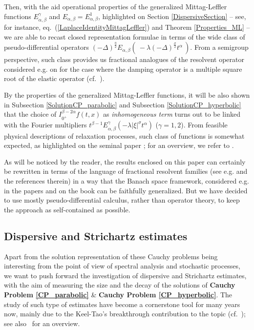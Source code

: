 \documentclass{amsart}
\theoremstyle{definition}
\theoremstyle{remark}
\numberwithin{equation}{section}
\begin{document}
Then, with the aid operational properties of the generalized Mittag-Leffler functions $E_{\alpha,\beta}^\gamma$ and $E_{\alpha,\beta}=E_{\alpha,\beta}^1$, highlighted on Section \ref{DispersiveSection} -- see, for instance, eq.~(\ref{LaplaceIdentityMittagLeffler}) and Theorem \ref{Properties_ML} -- we are able to recast closed representation formulae in terms of the wide class of pseudo-differential operators $\displaystyle (-\Delta)^{\frac{\eta}{2}}E_{\alpha,\beta}\left(~-\lambda (-\Delta)^{\frac{\sigma}{2}}t^\alpha~\right)$. From a semigroup perspective,
such class provides us fractional analogues of the resolvent operator considered e.g. on \cite{CCD08,CS05,DS15} for the case where the damping operator is a multiple square root of the elastic operator (cf.~\cite[Chapter VI]{engel2000one}).  

By the properties of the generalized Mittag-Leffler functions, it will be also shown in Subsection \ref{SolutionCP_parabolic} and Subsection \ref{SolutionCP_hyperbolic} that the choice of $I^{\beta-2\alpha}_{0^+}f(t,x)$ as {\it inhomogeneous term} turns out to be linked with the Fourier multipliers $\displaystyle t^{\beta-1}E_{\alpha,\beta}^{\gamma}(-\lambda|\xi|^\sigma t^{\alpha})$ ($\gamma=1,2$). From feasible physical descriptions of relaxation processes, such class of functions is somewhat expected, as highlighted on the seminal paper \cite{CapelasMainardiVaz11}; for an overview, we refer to \cite[Subsection 8.1.]{GKMaiR14}.

As will be noticed by the reader, the results enclosed on this paper can certainly be rewritten in terms of the language of fractional resolvent families (see e.g. \cite{LLPMeersch19} and the references therein) in a way that the Banach space framework, considered e.g. in the papers \cite{CS05,CCD08,DS15} and on the book \cite{engel2000one} can be faithfully generalized. But we have decided to use mostly pseudo-differential calculus, rather than operator theory, to keep the approach as self-contained as possible.


\subsection{Dispersive and Strichartz estimates}


Apart from the solution representation of these Cauchy problems being interesting from the point of view of spectral analysis and stochastic processes, we want to push forward the investigation of dispersive and Strichartz estimates, with the aim of measuring the size and the decay of the solutions of {\bf Cauchy Problem \ref{CP_parabolic}} \& {\bf Cauchy Problem \ref{CP_hyperbolic}}. The study of such type of estimates have become a cornerstone tool for many years now, mainly due to the Keel-Tao's breakthrough contribution to the topic (cf.~\cite{KTao98}); see also~\cite[Chapter 2.]{Tao06} for an overview.
\end{document}
